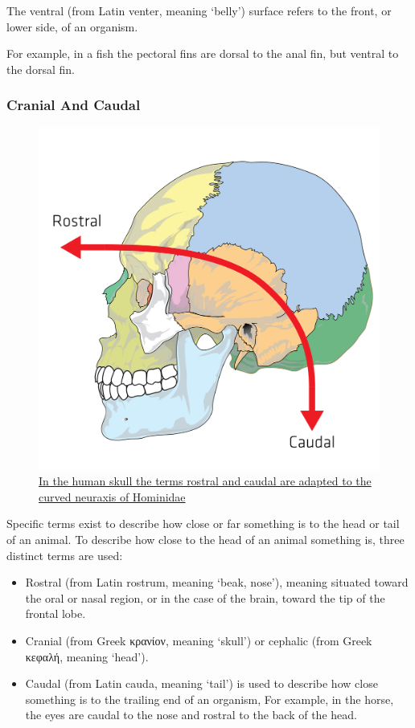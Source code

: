 The ventral (from Latin venter, meaning `belly') surface refers to the front, or lower side, of an organism.

For example, in a fish the pectoral fins are dorsal to the anal fin, but ventral to the dorsal fin.

\hypertarget{cranial-and-caudal}{%
\subsubsection{Cranial And Caudal}\label{cranial-and-caudal}}



\begin{figure}

{\centering \includegraphics[width=0.7\linewidth]{./figures/appendix/Rostralcaudal} 

}

\caption{\href{https://commons.wikimedia.org/wiki/File:Rostralcaudal.svg}{In the human skull the terms rostral and caudal are adapted to the curved neuraxis of Hominidae}}\label{fig:rostralcaudal}
\end{figure}

Specific terms exist to describe how close or far something is to the head or tail of an animal. To describe how close to the head of an animal something is, three distinct terms are used:

\begin{itemize}
\tightlist
\item
  Rostral (from Latin rostrum, meaning `beak, nose'), meaning situated toward the oral or nasal region, or in the case of the brain, toward the tip of the frontal lobe.
\item
  Cranial (from Greek κρανίον, meaning `skull') or cephalic (from Greek κεφαλή, meaning `head').
\item
  Caudal (from Latin cauda, meaning `tail') is used to describe how close something is to the trailing end of an organism,
  For example, in the horse, the eyes are caudal to the nose and rostral to the back of the head.
\end{itemize}

